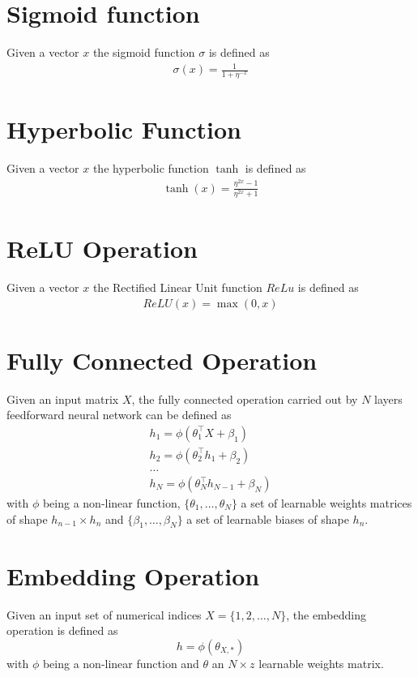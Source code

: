 \section{Sigmoid function}
Given a vector $x$ the sigmoid function $\sigma$ is defined as 
\begin{gather}
    \label{sigmoid}
    \sigma(x) = \frac {1} {1 + \eta^{-x}}
\end{gather}

\section{Hyperbolic Function}
Given a vector $x$ the hyperbolic function $\tanh$ is defined as 
\begin{gather}
    \label{tanh}
    \tanh(x) = \frac {\eta^{2x} -1} {\eta^{2x} +1}
\end{gather}

\section{ReLU Operation}
Given a vector $x$ the Rectified Linear Unit function $ReLu$ is defined as 
\begin{gather}
    \label{relu}
    ReLU(x) = \max(0, x)
\end{gather}

\section{Fully Connected Operation}
Given an input matrix $X$, the fully connected operation carried out by $N$ layers feedforward neural network can be defined as
\begin{gather}
    \label{fnn_operation}
    h_1 = \phi(\theta_1^\top X + \beta_1)\\ \nonumber
    h_2 = \phi(\theta_2^\top h_1  + \beta_2)\\ \nonumber
    \dots\\ \nonumber
    h_N = \phi(\theta_N^\top h_{N-1}  + \beta_N) \nonumber
\end{gather}
with $\phi$ being a non-linear function, $\{\theta_1, \dots, \theta_N\}$ a set of learnable weights matrices of shape $h_{n-1} \times h_{n}$  and $\{\beta_1, \dots, \beta_N\}$ a set of learnable biases of shape $h_n$.

\section{Embedding Operation}
Given an input set of numerical indices $X = \{1, 2, \dots, N\}$, the embedding operation is defined as 
\begin{equation}
    h = \phi(\theta_{X,*})
\end{equation}
with $\phi$ being a non-linear function and $\theta$ an $N \times z$ learnable weights matrix.


